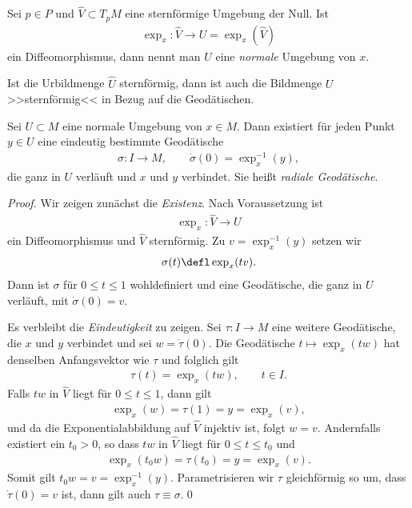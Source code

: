 \documentclass[%
	paper=a5,%
	fleqn,%
	DIV=18,%
	BCOR=0mm,
	fontsize=11pt,
	titlepage=false,%
	bibliography=totoc,
	DIV=18,%
	twoside=true,
	pdftitle=Riemannsche Geometrie,
	pdfauthor=Uwe Semmelmann,
	numbers=noendperiod]%
	{scrbook}
\begin{document}
\begin{defn}
Sei $p\in P$ und $\hat{V}\subset T_pM$ eine sternförmige Umgebung der Null. Ist
\begin{align*}
\exp_x : \hat{V}\to U = \exp_x(\hat{V})
\end{align*}
ein Diffeomorphismus, dann nennt man $U$ eine \emph{normale} Umgebung von
$x$.\fish
\end{defn}

Ist die Urbildmenge $\hat{U}$ sternförmig, dann ist auch die Bildmenge $U$
>>sternförmig<< in Bezug auf die Geodätischen.

\begin{lem} 
Sei $U\subset M$ eine normale Umgebung von $x\in M$. Dann existiert für jeden
Punkt $y\in U$ eine eindeutig bestimmte Geodätische
\begin{align*}
\sigma: I\to M,\qquad \dot{\sigma}(0) = \exp_x^{-1}(y),
\end{align*}
die ganz in $U$ verläuft und $x$ und $y$ verbindet. Sie heißt \emph{radiale Geodätische}.\fish
\end{lem}
\begin{proof}
Wir zeigen zunächst die \textit{Existenz}. Nach Voraussetzung ist
\begin{align*}
\exp_x \colon \hat{V}\to U
\end{align*}
ein Diffeomorphismus und $\hat{V}$ sternförmig. Zu $v= \exp_x^{-1}(y)$
setzen wir
\begin{align*}
\sigma(t) \defl \exp_x(tv).
\end{align*}
Dann ist $\sigma$ für $0\le t\le 1$ wohldefiniert und eine Geodätische, die ganz
in $U$ verläuft, mit $\dot{\sigma}(0) = v$.

Es verbleibt die \textit{Eindeutigkeit} zu zeigen. Sei $\tau: I\to M$ eine
weitere Geodätische, die $x$ und $y$ verbindet und sei $w = \dot{\tau}(0)$. Die
Geodätische $t\mapsto \exp_x(tw)$ hat denselben Anfangsvektor wie $\tau$ und
folglich gilt
\begin{align*}
\tau(t) = \exp_x(tw),\qquad t\in I.
\end{align*}
Falls $tw$ in $\hat{V}$ liegt für $0\le t\le 1$, dann gilt
\begin{align*}
\exp_x(w) = \tau(1) = y = \exp_x(v),
\end{align*}
und da die Exponentialabbildung auf $\hat{V}$ injektiv ist, folgt $w = v$. 
Andernfalls existiert ein $t_0 > 0$, so dass $tw$ in $\hat{V}$ liegt für $0\le
t\le t_0$ und
\begin{align*}
\exp_x(t_0 w) = \tau(t_0) = y = \exp_x(v).
\end{align*} 
Somit gilt $t_0w = v = \exp_x^{-1}(y)$. Parametrisieren wir $\tau$
gleichförmig so um, dass $\dot{\tau}(0) = v$ ist, dann gilt auch $\tau\equiv
\sigma$.\qed
\end{proof}
\end{document}

